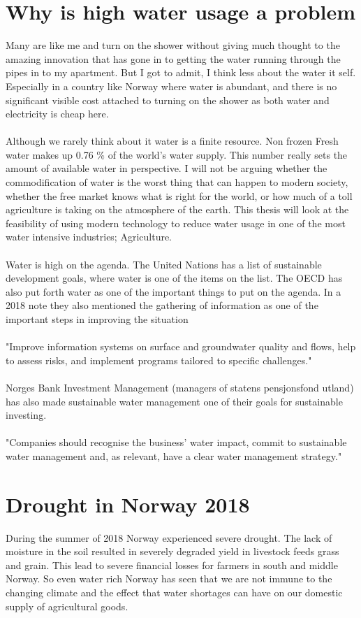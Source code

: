 \documentclass[]{uiophd}
\begin{document}
\section{Why is high water usage a problem}
Many are like me and turn on the shower without giving much thought to the amazing innovation that has gone in to getting the water running through the pipes in to my apartment. But I got to admit, I think less about the water it self. Especially in a country like Norway where water is abundant, and there is no significant visible cost attached to turning on the shower as both water and electricity is cheap here.
\\\\
Although we rarely think about it water is a finite resource. Non frozen Fresh water makes up 0.76 \% of the world's water supply. \cite{WaterinCrisis} This number really sets the amount of available water in perspective. I will not be arguing whether the commodification of water is the worst thing that can happen to modern society, whether the free market knows what is right for the world, or how much of a toll agriculture is taking on the atmosphere of the earth. This thesis will look at the feasibility of using modern technology to reduce water usage in one of the most water intensive industries; Agriculture. \cite{WorldBank}
\\\\
Water is high on the agenda. The United Nations has a list of sustainable development goals, where water is one of the items on the list. The OECD has also put forth water as one of the important things to put on the agenda. In a 2018 note they also mentioned the gathering of information as one of the important steps in improving the situation 
\\\\
"Improve information systems on surface and groundwater quality and flows, help to assess risks, and implement programs tailored to specific challenges."\cite{OECD}
\\\\
Norges Bank Investment Management (managers of statens pensjonsfond utland) has also made sustainable water management one of their goals for sustainable investing. 
\\\\
"Companies should recognise the business’
water impact, commit to sustainable water
management and, as relevant, have a clear
water management strategy." \cite{NBIM}

\section{Drought in Norway 2018}
 During the summer of 2018 Norway experienced severe drought. The lack of moisture in the soil resulted in severely degraded yield in livestock feeds grass and grain. This lead to severe financial losses for farmers in south and middle Norway. \cite{nve} So even water rich Norway has seen that we are not immune to the changing climate and the effect that water shortages can have on our domestic supply of agricultural goods. 
\end{document}
